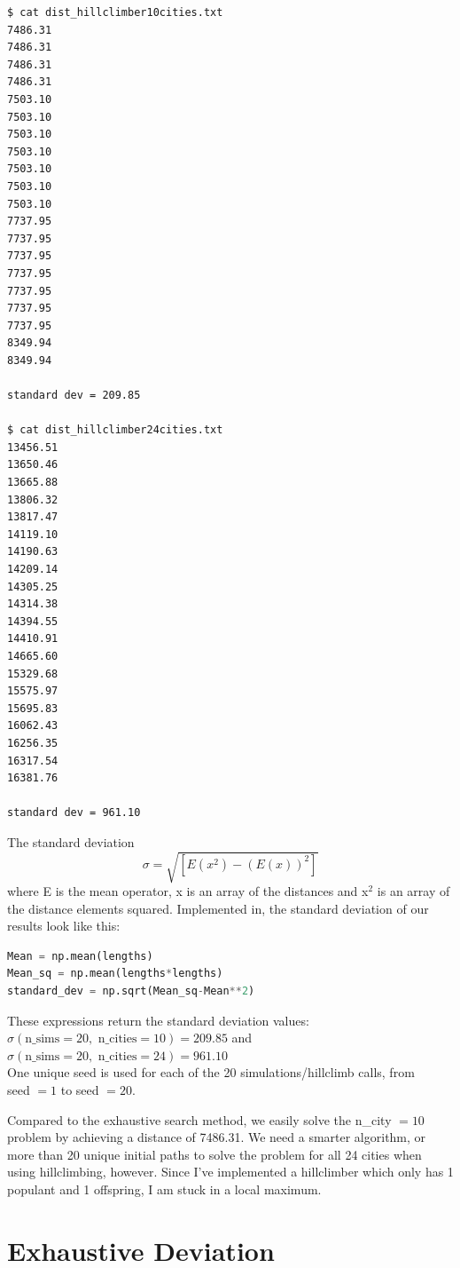 \documentclass[10pt, a4paper]{article}
\begin{document}
\begin{lstlisting}
$ cat dist_hillclimber10cities.txt 
7486.31
7486.31
7486.31
7486.31
7503.10
7503.10
7503.10
7503.10
7503.10
7503.10
7503.10
7737.95
7737.95
7737.95
7737.95
7737.95
7737.95
7737.95
8349.94
8349.94

standard dev = 209.85

$ cat dist_hillclimber24cities.txt 
13456.51
13650.46
13665.88
13806.32
13817.47
14119.10
14190.63
14209.14
14305.25
14314.38
14394.55
14410.91
14665.60
15329.68
15575.97
15695.83
16062.43
16256.35
16317.54
16381.76

standard dev = 961.10
\end{lstlisting}
The standard deviation $$ \sigma = \sqrt{ \left[ E(x^2) - (E(x))^2 \right] }$$
where E is the mean operator, x is an array of the distances and x$^2$ is an array of the distance elements squared.
Implemented in, the standard deviation of our results look like this:
\begin{lstlisting}[language = Python]
Mean = np.mean(lengths)
Mean_sq = np.mean(lengths*lengths)
standard_dev = np.sqrt(Mean_sq-Mean**2)
\end{lstlisting}
These expressions return the standard deviation values: \\
$\sigma(\text{n\_sims} = 20, \text{ n\_cities} = 10) = 209.85$ and \\
$\sigma(\text{n\_sims} = 20, \text{ n\_cities} = 24) = 961.10$ \\

One unique seed is used for each of the 20 simulations/hillclimb calls, from \\seed $= 1$ to seed $= 20$.

Compared to the exhaustive search method, we easily solve the n\_city $= 10$ problem by achieving a distance of 7486.31.
We need a smarter algorithm, or more than 20 unique initial paths to solve the problem for all 24 cities when using hillclimbing, however.
Since I've implemented a hillclimber which only has 1 populant and 1 offspring, I am stuck in a local maximum.

\section{Exhaustive Deviation}
\end{document}
